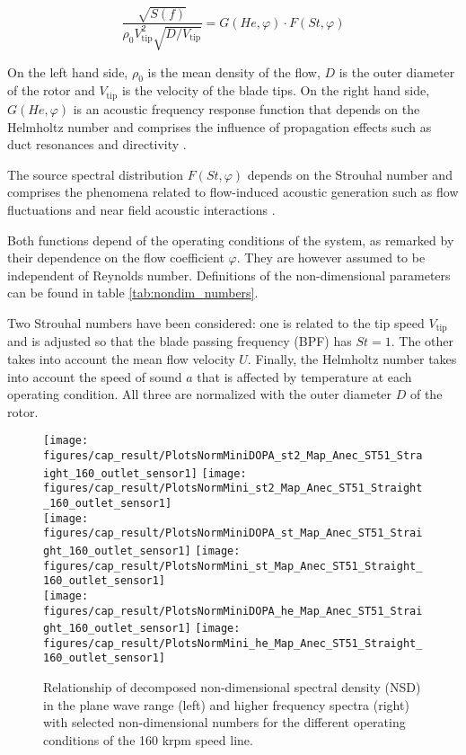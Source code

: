 \begin{equation}\label{eq:non-dim_spectra}
	\frac{\sqrt{S(f)}}{\rho_0 V^2_\text{tip}\sqrt{D/V_\text{tip}}}=
	G(He,\varphi)\cdot F(St,\varphi)
\end{equation}

On the left hand side, $\rho_0$ is the mean density of the flow, $D$ is the outer diameter of the rotor and $V_\text{tip}$ is the velocity of the blade tips. On the right hand side, $G(He,\varphi)$ is an acoustic frequency response function that depends on the Helmholtz number and comprises the influence of propagation effects such as duct resonances and directivity \cite{mongeau1993sound,wolfram2009detection}. 

The source spectral distribution $F(St,\varphi)$ depends on the Strouhal number and comprises the phenomena related to flow-induced acoustic generation such as flow fluctuations and near field acoustic interactions \cite{mongeau1995method}.

Both functions depend of the operating conditions of the system, as remarked by their dependence on the flow coefficient $\varphi$. They are however assumed to be independent of Reynolds number. Definitions of the non-dimensional parameters can be found in table \ref{tab:nondim_numbers}. 

Two Strouhal numbers have been considered: one is related to the tip speed $V_\text{tip}$ and is adjusted so that the blade passing frequency (BPF) has $St=1$. The other takes into account the mean flow velocity $U$. Finally, the Helmholtz number takes into account the speed of sound $a$ that is affected by temperature at each operating condition. All three are normalized with the outer diameter $D$ of the rotor.

\begin{figure}[tb!]
\centering
\texttt{[image: figures/cap\_result/PlotsNormMiniDOPA\_st2\_Map\_Anec\_ST51\_Straight\_160\_outlet\_sensor1]}\hspace{3mm}
\texttt{[image: figures/cap\_result/PlotsNormMini\_st2\_Map\_Anec\_ST51\_Straight\_160\_outlet\_sensor1]}\\[4mm]
\texttt{[image: figures/cap\_result/PlotsNormMiniDOPA\_st\_Map\_Anec\_ST51\_Straight\_160\_outlet\_sensor1]}\hspace{3mm}
\texttt{[image: figures/cap\_result/PlotsNormMini\_st\_Map\_Anec\_ST51\_Straight\_160\_outlet\_sensor1]}\\[4mm]
\texttt{[image: figures/cap\_result/PlotsNormMiniDOPA\_he\_Map\_Anec\_ST51\_Straight\_160\_outlet\_sensor1]}\hspace{3mm}
\texttt{[image: figures/cap\_result/PlotsNormMini\_he\_Map\_Anec\_ST51\_Straight\_160\_outlet\_sensor1]}
\caption{Relationship of decomposed non-dimensional spectral density (NSD) in the plane wave range (left) and higher frequency spectra (right) with selected non-dimensional numbers for the different operating conditions of the 160 krpm speed line.}
\label{fig:result_norm_all}
\end{figure}

